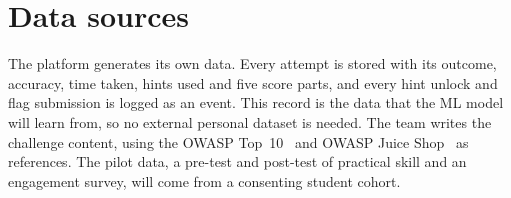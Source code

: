 \section{Data sources}

The platform generates its own data. Every attempt is stored with its outcome, accuracy, time taken, hints used and five score parts, and every hint unlock and flag submission is logged as an event. This record is the data that the ML model will learn from, so no external personal dataset is needed. The team writes the challenge content, using the OWASP Top~10~\cite{OwaspTop10} and OWASP Juice Shop~\cite{OwaspJuiceShop} as references. The pilot data, a pre-test and post-test of practical skill and an engagement survey, will come from a consenting student cohort.
